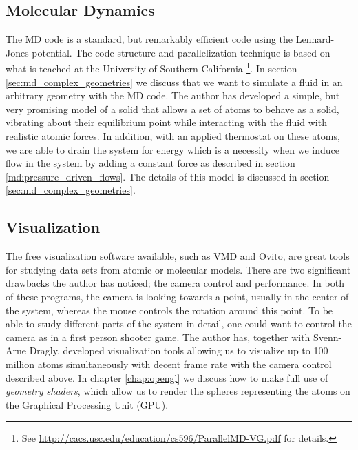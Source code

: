 \subsection{Molecular Dynamics}
The MD code is a standard, but remarkably efficient code using the Lennard-Jones potential. The code structure and parallelization technique is based on what is teached at the University of Southern California \footnote{See \url{http://cacs.usc.edu/education/cs596/ParallelMD-VG.pdf} for details.}. In section \ref{sec:md_complex_geometries} we discuss that we want to simulate a fluid in an arbitrary geometry with the MD code. The author has developed a simple, but very promising model of a solid that allows a set of atoms to behave as a solid, vibrating about their equilibrium point while interacting with the fluid with realistic atomic forces. In addition, with an applied thermostat on these atoms, we are able to drain the system for energy which is a necessity when we induce flow in the system by adding a constant force as described in section \ref{md:pressure_driven_flows}. The details of this model is discussed in section \ref{sec:md_complex_geometries}.
\subsection{Visualization}
The free visualization software available, such as VMD and Ovito, are great tools for studying data sets from atomic or molecular models. There are two significant drawbacks the author has noticed; the camera control and performance. In both of these programs, the camera is looking towards a point, usually in the center of the system, whereas the mouse controls the rotation around this point. To be able to study different parts of the system in detail, one could want to control the camera as in a first person shooter game. The author has, together with Svenn-Arne Dragly, developed visualization tools allowing us to visualize up to 100 million atoms simultaneously with decent frame rate with the camera control described above. In chapter \ref{chap:opengl} we discuss how to make full use of \textit{geometry shaders}, which allow us to render the spheres representing the atoms on the Graphical Processing Unit (GPU). 